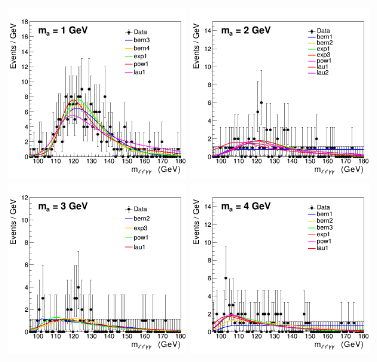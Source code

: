 \begin{figure}[htbp]
  \begin{center}
		\includegraphics[width=0.42\textwidth]{figures/chapter04/bkg_fTest/allPdfs_cat0_1.png}
        \includegraphics[width=0.42\textwidth]{figures/chapter04/bkg_fTest/allPdfs_cat0_2.png} \\
		\includegraphics[width=0.42\textwidth]{figures/chapter04/bkg_fTest/allPdfs_cat0_3.png}
		\includegraphics[width=0.42\textwidth]{figures/chapter04/bkg_fTest/allPdfs_cat0_4.png}\\

\end{center}
\end{figure}
